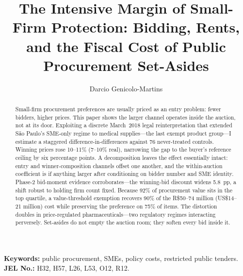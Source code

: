 \documentclass[12pt]{elsarticle}
\begin{document}
\begin{frontmatter}
\title{\textbf{The Intensive Margin of Small-Firm Protection: Bidding, Rents, and the Fiscal Cost of Public Procurement Set-Asides}}
\author[INSPER]{Darcio Genicolo-Martins}  
\address[INSPER]{INSPER}

\begin{abstract}
Small-firm procurement preferences are usually priced as an entry problem: fewer bidders, higher prices. This paper shows the larger channel operates inside the auction, not at its door. Exploiting a discrete March~2018 legal reinterpretation that extended S\~ao Paulo's SME-only regime to medical supplies---the last exempt product group---I estimate a staggered difference-in-differences against 76 never-treated controls. Winning prices rose 10--11\% (7--10\% real), narrowing the gap to the buyer's reference ceiling by six percentage points. A \citet{gelbach2016} decomposition leaves the effect essentially intact: entry and winner-composition channels offset one another, and the within-auction coefficient is if anything larger after conditioning on bidder number and SME identity. Phase-2 bid-moment evidence corroborates---the winning-bid discount widens 5.8~pp, a shift robust to holding firm count fixed. Because 92\% of procurement value sits in the top quartile, a value-threshold exemption recovers 90\% of the R\$50--74 million (US\$14--21 million) cost while preserving the preference on 75\% of items. The distortion doubles in price-regulated pharmaceuticals---two regulatory regimes interacting perversely. Set-asides do not empty the auction room; they soften every bid inside it.
\end{abstract}

\end{frontmatter}
\textbf{Keywords:} public procurement, SMEs, policy costs, restricted public tenders.\\
\textbf{JEL No.:} H32, H57, L26, L53, O12, R12.

\newcommand{\introheading}{\section{Introduction}}





\clearpage


\clearpage
\appendix

\end{document}
